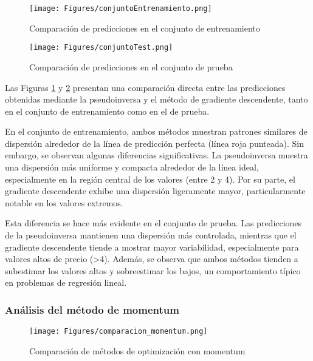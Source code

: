 \documentclass{tp02}
\begin{document}
\begin{figure}[H]
    \centering
    \texttt{[image: Figures/conjuntoEntrenamiento.png]}
    \caption{Comparación de predicciones en el conjunto de entrenamiento}
    \label{fig:conjunto-entrenamiento}
    \end{figure}

\begin{figure}[H]
    \centering
    \texttt{[image: Figures/conjuntoTest.png]}
    \caption{Comparación de predicciones en el conjunto de prueba}
    \label{fig:conjunto-test}
    \end{figure}

Las Figuras \ref{fig:conjunto-entrenamiento} y \ref{fig:conjunto-test} 
presentan una comparación directa entre las predicciones obtenidas mediante 
la pseudoinversa y el método de gradiente descendente, tanto en el conjunto 
de entrenamiento como en el de prueba.

En el conjunto de entrenamiento, ambos métodos muestran patrones 
similares de dispersión alrededor de la línea de predicción perfecta 
(línea roja punteada). Sin embargo, se observan algunas diferencias 
significativas. La pseudoinversa muestra una dispersión más uniforme y 
compacta alrededor de la línea ideal, especialmente en la región central 
de los valores (entre 2 y 4). Por su parte, el gradiente descendente 
exhibe una dispersión ligeramente mayor, particularmente notable en los 
valores extremos.

Esta diferencia se hace más evidente en el conjunto de prueba. Las 
predicciones de la pseudoinversa mantienen una dispersión más controlada, 
mientras que el gradiente descendente tiende a mostrar mayor variabilidad, 
especialmente para valores altos de precio (>4). Además, se observa que 
ambos métodos tienden a subestimar los valores altos y sobreestimar los 
bajos, un comportamiento típico en problemas de regresión lineal.


\subsubsection{Análisis del método de momentum}

\begin{figure}[H]
    \centering
    \texttt{[image: Figures/comparacion\_momentum.png]}
    \caption{Comparación de métodos de optimización con momentum}
    \label{fig:comparacion_momentum}
    \end{figure}
\end{document}
